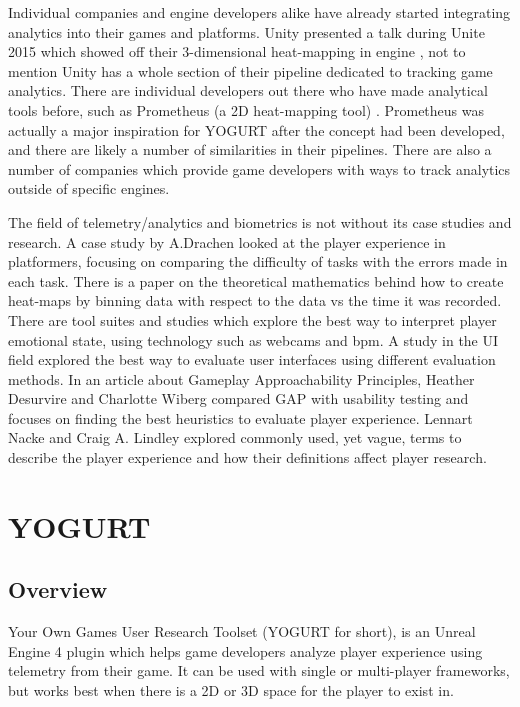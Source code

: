 \documentclass[journal]{IEEEtran}
\begin{document}
Individual companies and engine developers alike have already started integrating analytics into their games and platforms. Unity presented a talk during Unite 2015 which showed off their 3-dimensional heat-mapping in engine \cite{unite2015}, not to mention Unity has a whole section of their pipeline dedicated to tracking game analytics. There are individual developers out there who have made analytical tools before, such as Prometheus (a 2D heat-mapping tool) \cite{gibbs}. Prometheus was actually a major inspiration for YOGURT after the concept had been developed, and there are likely a number of similarities in their pipelines. There are also a number of companies which provide game developers with ways to track analytics outside of specific engines. \cite{simpleusability} \cite{drachen}

The field of telemetry/analytics and biometrics is not without its case studies and research. A case study by A.Drachen looked at the player experience in platformers, focusing on comparing the difficulty of tasks with the errors made in each task. \cite{wehbe} There is a paper on the theoretical mathematics behind how to create heat-maps by binning data with respect to the data vs the time it was recorded. \cite{kumatani} There are tool suites and studies which explore the best way to interpret player emotional state, using technology such as webcams and bpm. \cite{dingli} A study in the UI field explored the best way to evaluate user interfaces using different evaluation methods. \cite{nielsen} In an article about Gameplay Approachability Principles, Heather Desurvire and Charlotte Wiberg compared GAP with usability testing and focuses on finding the best heuristics to evaluate player experience. \cite{desurvire} Lennart Nacke and Craig A. Lindley explored commonly used, yet vague, terms to describe the player experience and how their definitions affect player research. \cite{nacke}


\section{YOGURT}

\subsection{Overview}

Your Own Games User Research Toolset (YOGURT for short), is an Unreal Engine 4 plugin which helps game developers analyze player experience using telemetry from their game. It can be used with single or multi-player frameworks, but works best when there is a 2D or 3D space for the player to exist in.
\end{document}
